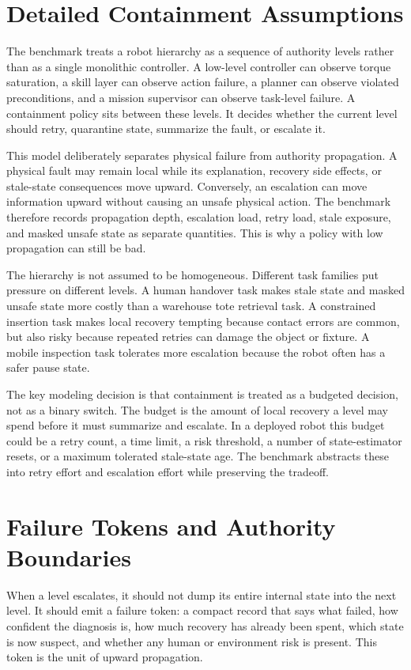 \section{Detailed Containment Assumptions}

The benchmark treats a robot hierarchy as a sequence of authority levels rather than as a single monolithic controller. A low-level controller can observe torque saturation, a skill layer can observe action failure, a planner can observe violated preconditions, and a mission supervisor can observe task-level failure. A containment policy sits between these levels. It decides whether the current level should retry, quarantine state, summarize the fault, or escalate it.

This model deliberately separates physical failure from authority propagation. A physical fault may remain local while its explanation, recovery side effects, or stale-state consequences move upward. Conversely, an escalation can move information upward without causing an unsafe physical action. The benchmark therefore records propagation depth, escalation load, retry load, stale exposure, and masked unsafe state as separate quantities. This is why a policy with low propagation can still be bad.

The hierarchy is not assumed to be homogeneous. Different task families put pressure on different levels. A human handover task makes stale state and masked unsafe state more costly than a warehouse tote retrieval task. A constrained insertion task makes local recovery tempting because contact errors are common, but also risky because repeated retries can damage the object or fixture. A mobile inspection task tolerates more escalation because the robot often has a safer pause state.

The key modeling decision is that containment is treated as a budgeted decision, not as a binary switch. The budget is the amount of local recovery a level may spend before it must summarize and escalate. In a deployed robot this budget could be a retry count, a time limit, a risk threshold, a number of state-estimator resets, or a maximum tolerated stale-state age. The benchmark abstracts these into retry effort and escalation effort while preserving the tradeoff.

\section{Failure Tokens and Authority Boundaries}

When a level escalates, it should not dump its entire internal state into the next level. It should emit a failure token: a compact record that says what failed, how confident the diagnosis is, how much recovery has already been spent, which state is now suspect, and whether any human or environment risk is present. This token is the unit of upward propagation.

